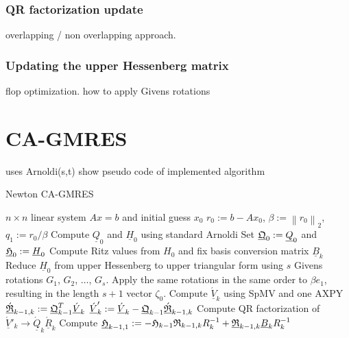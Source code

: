 \documentclass{scrartcl}
\newcommand{\norm}[1]{\left\lVert#1\right\rVert}
\begin{document}
\subsubsection{QR factorization update}
overlapping / non overlapping approach.

\subsubsection{Updating the upper Hessenberg matrix}
flop optimization. how to apply Givens rotations

\section{CA-GMRES}
uses Arnoldi(s,t)
show pseudo code of implemented algorithm

\begin{algorithm} %
\caption{Newton CA-GMRES} %
\label{alg1} %
\begin{algorithmic}[1] %
    \REQUIRE $n \times n$ linear system $Ax = b$ and initial guess $x_0$
    \STATE $r_0:=b-Ax_0$, $\beta := \norm{r_0}_2$, $q_1 := r_0/\beta$
        	\STATE Compute $\underline{Q}_0$ and $\underline{H}_0$ using standard Arnoldi
        	\STATE Set $\underline{\frak{Q}}_0 := \underline{Q}_0$ and $\underline{\frak{H}}_0 := \underline{H}_0$
        	\STATE Compute Ritz values from $H_0$ and fix basis conversion matrix $\underline{B}_k$
			\STATE Reduce $\underline{H}_0$ from upper Hessenberg to upper triangular form using $s$ Givens \\
\hspace{\algorithmicindent} rotations $G_1$, $G_2$, $ \ldots$, $G_s$. Apply the same rotations in the same order to $\beta e_1$, \\
\hspace{\algorithmicindent} resulting in the length $s + 1$ vector $\zeta_0$.
		\ELSE
			\STATE Compute $\underline{\acute{V}}_k$ using SpMV and one AXPY
			\STATE $\underline{\acute{\frak{R}}}_{k-1,k} := \underline{\frak{Q}}^T_{k-1} \underline{\acute{V}}_k$
			\STATE $\underline{\acute{V}}'_k := \underline{\acute{V}}_k - \underline{\frak{Q}}_{k-1}\underline{\acute{\frak{R}}}_{k-1,k}$
			\STATE Compute QR factorization of $\underline{\acute{V}}'_k \rightarrow \underline{\acute{Q}}_k \underline{\acute{R}}_k$
			\STATE Compute $\underline{\frak{H}}_{k-1,1}:= - \frak{H}_{k-1} \frak{R}_{k-1,k} R^{-1}_k + \underline{\frak{R}}_{k-1,k} \underline{B}_k R^{-1}_k$

\end{algorithmic}
\end{algorithm}
\end{document}
